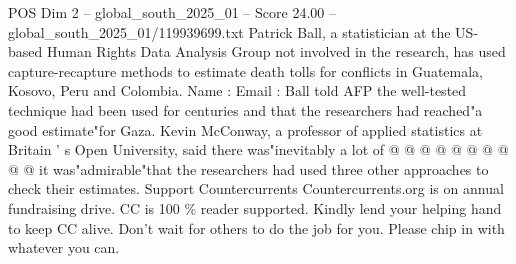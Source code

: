 \begin{textsample}{POS Dim 2 – global\_south\_2025\_01 – Score 24.00 – global\_south\_2025\_01/119939699.txt}
Patrick Ball, a statistician at the US-based Human Rights Data Analysis Group not involved in the research, has used capture-recapture methods to estimate death tolls for conflicts in Guatemala, Kosovo, Peru and Colombia.
Name : Email : Ball told AFP the well-tested technique had been used for centuries and that the researchers had reached"a good estimate"for Gaza.
Kevin McConway, a professor of applied statistics at Britain ' s Open University, said there was"inevitably a lot of @ @ @ @ @ @ @ @ @ @ it was"admirable"that the researchers had used three other approaches to check their estimates.
Support Countercurrents Countercurrents.org is on annual fundraising drive.
CC is 100 \% reader supported.
Kindly lend your helping hand to keep CC alive.
Don't wait for others to do the job for you.
Please chip in with whatever you can.

\end{textsample}
